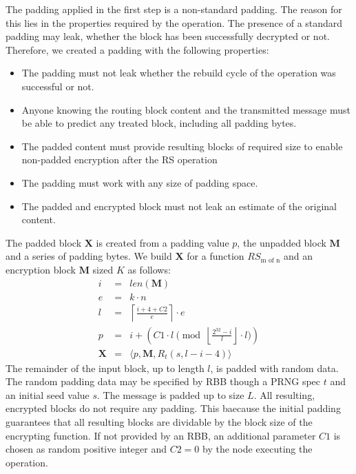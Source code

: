 \documentclass[acmsmall, screen, final, natbib=false]{acmart}
\begin{document}
	The padding applied in the first step is a non-standard padding. The reason for this lies in the properties required by the operation. The presence of a standard padding may leak, whether the block has been successfully decrypted or not. Therefore, we created a padding with the following properties:
	\begin{itemize}
		\item The padding must not leak whether the rebuild cycle of the operation was successful or not.
		\item Anyone knowing the routing block content and the transmitted message must be able to predict any treated block, including all padding bytes.
		\item The padded content must provide resulting blocks of required size to enable non-padded encryption after the RS operation
		\item The padding must work with any size of padding space.
		\item The padded and encrypted block must not leak an estimate of the original content.
	\end{itemize}
	
	The padded block $\mathbf{X}$ is created from a padding value $p$, the unpadded block $\mathbf{M}$ and a series of padding bytes. We build $\mathbf{X}$ for a function $RS_{\text{m of n}}$ and an encryption block $\mathbf{M}$ sized $K$ as follows:
	\begin{eqnarray}
	i          & = & len(\mathbf{M})\\
	e          & = & k \cdot n\\
	l          & = & \left\lceil\frac{i + 4 + C2 }{e}\right\rceil\cdot e\\
	p          & = & i + \left( C1 \cdot l \pmod{\left\lfloor\frac{2^{32}-i}{l}\right\rfloor\cdot l}\right)\\
	\mathbf{X} & = & \langle p,\mathbf{M},R_{t}\left(s,l-i-4\right)\rangle
	\end{eqnarray}    
	The remainder of the input block, up to length $l$, is padded with random data. The random padding data may be specified by RBB though a PRNG spec $t$ and an initial seed value $s$. The message is padded up to size $L$. All resulting, encrypted blocks do not require any padding. This baecause the initial padding guarantees that all resulting blocks are dividable by the block size of the encrypting function. If not provided by an RBB, an additional parameter $C1$ is chosen as random positive integer and $C2=0$  by the node executing the operation.
	
\end{document}
